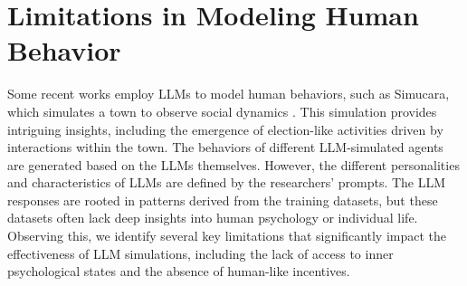 \section{Limitations in Modeling Human Behavior}
Some recent works employ LLMs to model human behaviors, such as Simucara, which simulates a town to observe social dynamics \citep{Park2023GenerativeAgents}. This simulation provides intriguing insights, including the emergence of election-like activities driven by interactions within the town. The behaviors of different LLM-simulated agents are generated based on the LLMs themselves. However, the different personalities and characteristics of LLMs are defined by the researchers' prompts. The LLM responses are rooted in patterns derived from the training datasets, but these datasets often lack deep insights into human psychology or individual life. Observing this, we identify several key limitations that significantly impact the effectiveness of LLM simulations, including the lack of access to inner psychological states and the absence of human-like incentives.


